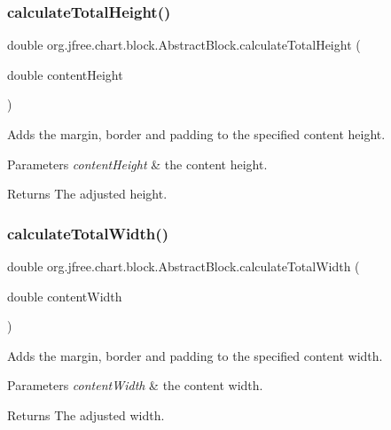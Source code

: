 \subsubsection{\texorpdfstring{calculate\+Total\+Height()}{calculateTotalHeight()}}
{\footnotesize\ttfamily double org.\+jfree.\+chart.\+block.\+Abstract\+Block.\+calculate\+Total\+Height (\begin{DoxyParamCaption}\item[{double}]{content\+Height }\end{DoxyParamCaption})\hspace{0.3cm}{\ttfamily [protected]}}

Adds the margin, border and padding to the specified content height.


\begin{DoxyParams}{Parameters}
{\em content\+Height} & the content height.\\
\hline
\end{DoxyParams}
\begin{DoxyReturn}{Returns}
The adjusted height. 
\end{DoxyReturn}
\mbox{\label{classorg_1_1jfree_1_1chart_1_1block_1_1_abstract_block_a9f8343fc16a5da00d6481f63169644be}} 
\subsubsection{\texorpdfstring{calculate\+Total\+Width()}{calculateTotalWidth()}}
{\footnotesize\ttfamily double org.\+jfree.\+chart.\+block.\+Abstract\+Block.\+calculate\+Total\+Width (\begin{DoxyParamCaption}\item[{double}]{content\+Width }\end{DoxyParamCaption})\hspace{0.3cm}{\ttfamily [protected]}}

Adds the margin, border and padding to the specified content width.


\begin{DoxyParams}{Parameters}
{\em content\+Width} & the content width.\\
\hline
\end{DoxyParams}
\begin{DoxyReturn}{Returns}
The adjusted width. 
\end{DoxyReturn}
\mbox{\label{classorg_1_1jfree_1_1chart_1_1block_1_1_abstract_block_a4244c031ab17030862f4af2ca72873bc}} 

